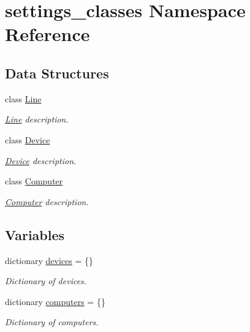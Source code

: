 \hypertarget{namespacesettings__classes}{\section{settings\-\_\-classes \-Namespace \-Reference}
\label{namespacesettings__classes}
}
\subsection*{\-Data \-Structures}
\begin{DoxyCompactItemize}
\item 
class \hyperlink{classsettings__classes_1_1_line}{\-Line}
\begin{DoxyCompactList}\small\item\em \hyperlink{classsettings__classes_1_1_line}{\-Line} description. \end{DoxyCompactList}\item 
class \hyperlink{classsettings__classes_1_1_device}{\-Device}
\begin{DoxyCompactList}\small\item\em \hyperlink{classsettings__classes_1_1_device}{\-Device} description. \end{DoxyCompactList}\item 
class \hyperlink{classsettings__classes_1_1_computer}{\-Computer}
\begin{DoxyCompactList}\small\item\em \hyperlink{classsettings__classes_1_1_computer}{\-Computer} description. \end{DoxyCompactList}\end{DoxyCompactItemize}
\subsection*{\-Variables}
\begin{DoxyCompactItemize}
\item 
dictionary \hyperlink{namespacesettings__classes_ad576a95c9c6a09a6b589dcb7c67b5c6d}{devices} = \{\}
\begin{DoxyCompactList}\small\item\em \-Dictionary of devices. \end{DoxyCompactList}\item 
dictionary \hyperlink{namespacesettings__classes_abdbbd72da73285ea3f5115c9853b6792}{computers} = \{\}
\begin{DoxyCompactList}\small\item\em \-Dictionary of computers. \end{DoxyCompactList}\end{DoxyCompactItemize}


